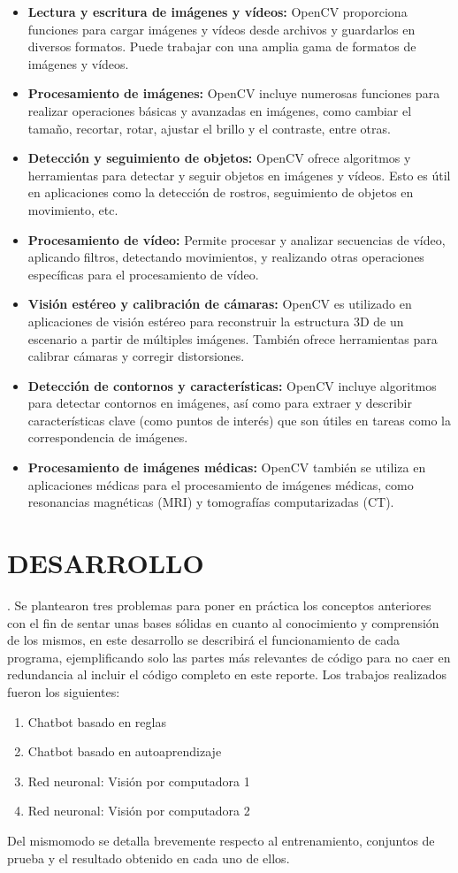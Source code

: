 \documentclass[a4paper,
               ]{jacow}
\begin{document}
\begin{itemize}
    \item \textbf{Lectura y escritura de imágenes y vídeos:} OpenCV proporciona funciones para cargar imágenes y vídeos desde archivos y guardarlos en diversos formatos. Puede trabajar con una amplia gama de formatos de imágenes y vídeos. 
    \item \textbf{Procesamiento de imágenes:} OpenCV incluye numerosas funciones para realizar operaciones básicas y avanzadas en imágenes, como cambiar el tamaño, recortar, rotar, ajustar el brillo y el contraste, entre otras. 
    \item \textbf{Detección y seguimiento de objetos:} OpenCV ofrece algoritmos y herramientas para detectar y seguir objetos en imágenes y vídeos. Esto es útil en aplicaciones como la detección de rostros, seguimiento de objetos en movimiento, etc.
    \item \textbf{Procesamiento de vídeo:} Permite procesar y analizar secuencias de vídeo, aplicando filtros, detectando movimientos, y realizando otras operaciones específicas para el procesamiento de vídeo.
    \item \textbf{Visión estéreo y calibración de cámaras:} OpenCV es utilizado en aplicaciones de visión estéreo para reconstruir la estructura 3D de un escenario a partir de múltiples imágenes. También ofrece herramientas para calibrar cámaras y corregir distorsiones.
    \item \textbf{Detección de contornos y características:} OpenCV incluye algoritmos para detectar contornos en imágenes, así como para extraer y describir características clave (como puntos de interés) que son útiles en tareas como la correspondencia de imágenes.
    \item \textbf{Procesamiento de imágenes médicas:} OpenCV también se utiliza en aplicaciones médicas para el procesamiento de imágenes médicas, como resonancias magnéticas (MRI) y tomografías computarizadas (CT).
\end{itemize}

\section{DESARROLLO}.
Se plantearon tres problemas para poner en práctica los conceptos anteriores con el fin de sentar unas bases sólidas en cuanto al conocimiento y comprensión de los mismos, en este desarrollo se describirá el funcionamiento de cada programa, ejemplificando solo las partes más relevantes de código para no caer en redundancia al incluir el código completo en este reporte. Los trabajos realizados fueron los siguientes: 
\begin{enumerate}
    \item Chatbot basado en reglas
    \item Chatbot basado en autoaprendizaje
    \item Red neuronal: Visión por computadora 1
    \item Red neuronal: Visión por computadora 2
\end{enumerate}
Del mismomodo se detalla brevemente respecto al entrenamiento, conjuntos de prueba y el resultado obtenido en cada uno de ellos.
\end{document}
